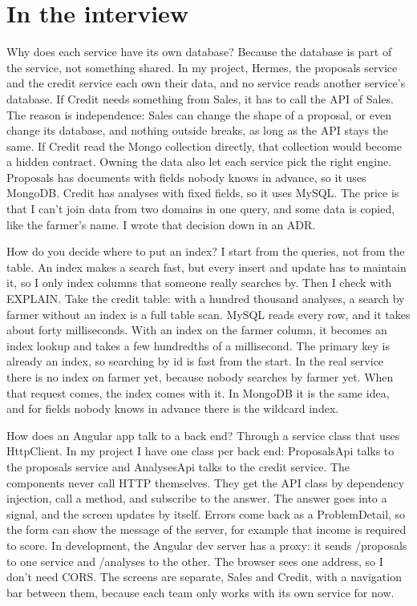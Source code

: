 \section*{In the interview}

\begin{interview}{Why does each service have its own database?}
Because the database is part of the service, not something shared. In my
project, Hermes, the proposals service and the credit service each own their
data, and no service reads another service's database. If Credit needs
something from Sales, it has to call the API of Sales. The reason is
independence: Sales can change the shape of a proposal, or even change its
database, and nothing outside breaks, as long as the API stays the same. If
Credit read the Mongo collection directly, that collection would become a
hidden contract. Owning the data also let each service pick the right engine.
Proposals has documents with fields nobody knows in advance, so it uses
MongoDB. Credit has analyses with fixed fields, so it uses MySQL. The price
is that I can't join data from two domains in one query, and some data is
copied, like the farmer's name. I wrote that decision down in an ADR.
\end{interview}

\begin{interview}{How do you decide where to put an index?}
I start from the queries, not from the table. An index makes a search fast,
but every insert and update has to maintain it, so I only index columns that
someone really searches by. Then I check with EXPLAIN. Take the credit
table: with a hundred thousand analyses, a search by farmer without an index
is a full table scan. MySQL reads every row, and it takes about forty
milliseconds. With an index on the farmer column, it becomes an index
lookup and takes a few hundredths of a millisecond. The primary key is already
an index, so searching by id is fast from the start. In the real service
there is no index on farmer yet, because nobody searches by farmer yet. When
that request comes, the index comes with it. In MongoDB it is the same idea,
and for fields nobody knows in advance there is the wildcard index.
\end{interview}

\begin{interview}{How does an Angular app talk to a back end?}
Through a service class that uses HttpClient. In my project I have one class
per back end: ProposalsApi talks to the proposals service and AnalysesApi
talks to the credit service. The components never call HTTP themselves. They
get the API class by dependency injection, call a method, and subscribe to
the answer. The answer goes into a signal, and the screen updates by itself.
Errors come back as a ProblemDetail, so the form can show the message of the
server, for example that income is required to score. In development, the
Angular dev server has a proxy: it sends /proposals to one service and
/analyses to the other. The browser sees one address, so I don't need CORS.
The screens are separate, Sales and Credit, with a navigation bar between
them, because each team only works with its own service for now.
\end{interview}
